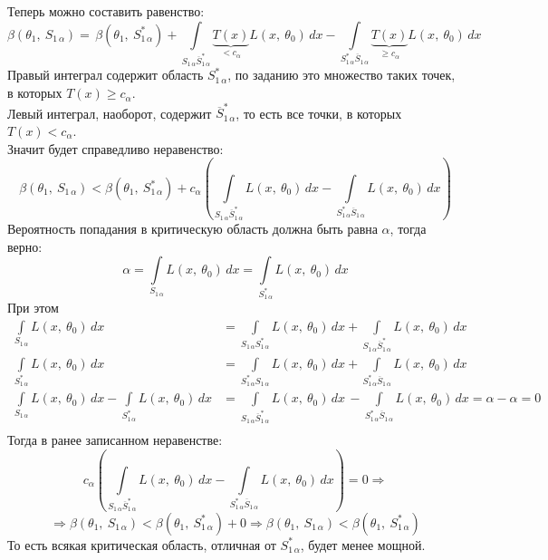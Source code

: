 \documentclass[12pt, a4paper]{article}
\begin{document}
Теперь можно составить равенство:
\[\beta(\theta_1,\ S_{1\, \alpha}) =\, \beta(\theta_1,\ S^*_{1\, \alpha}) + \int\limits_{S_{1\, \alpha} \overline{S}^*_{1\, \alpha}} \underset{< c_{\alpha}}{\underbrace{T(x)}} L(x,\ \theta_0)\, dx - \int\limits_{S^*_{1\, \alpha} \overline{S}_{1\, \alpha}} \underset{\geq c_{\alpha}}{\underbrace{T(x)}} L(x,\ \theta_0)\, dx\]
Правый интеграл содержит область $S_{1\, \alpha}^*$, по заданию это множество таких точек, в которых $T(x) \geq c_{\alpha}$.\\
Левый интеграл, наоборот, содержит $\overline{S}_{1\, \alpha}^*$, то есть все точки, в которых $T(x) < c_{\alpha}$.\\
Значит будет справедливо неравенство:
\[\beta(\theta_1,\ S_{1\, \alpha}) < \beta(\theta_1,\ S^*_{1\, \alpha}) + c_{\alpha}\left( \int\limits_{S_{1\, \alpha} \overline{S}^*_{1\, \alpha}} L(x,\ \theta_0)\, dx - \int\limits_{S^*_{1\, \alpha} \overline{S}_{1\, \alpha}} L(x,\ \theta_0)\, dx \right)\]
Вероятность попадания в критическую область должна быть равна $\alpha$, тогда верно:
\[\alpha = \int\limits_{S_{1\, \alpha}} L(x,\ \theta_0)\, dx = \int\limits_{S^*_{1\, \alpha}} L(x,\ \theta_0)\, dx\]
При этом
\begin{equation*}
    \begin{aligned}
        \int\limits_{S_{1\, \alpha}} L(x,\ \theta_0)\, dx &= \int\limits_{S_{1\, \alpha} S^*_{1\, \alpha}} L(x,\ \theta_0)\, dx + \int\limits_{S_{1\, \alpha} \overline{S}_{1\, \alpha}^*} L(x,\ \theta_0)\, dx\\
        \int\limits_{S^*_{1\, \alpha}} L(x,\ \theta_0)\, dx &= \int\limits_{ S^*_{1\, \alpha} S_{1\, \alpha}} L(x,\ \theta_0)\, dx + \int\limits_{S^*_{1\, \alpha} \overline{S}_{1\, \alpha}} L(x,\ \theta_0)\, dx\\
        \int\limits_{S_{1\, \alpha}} L(x,\ \theta_0)\, dx - \int\limits_{S^*_{1\, \alpha}} L(x,\ \theta_0)\, dx &= \int\limits_{S_{1\, \alpha} \overline{S}_{1\, \alpha}^*} L(x,\ \theta_0)\, dx\, - \int\limits_{S^*_{1\, \alpha} \overline{S}_{1\, \alpha}} L(x,\ \theta_0)\, dx = \alpha - \alpha = 0\\
    \end{aligned}
\end{equation*}
Тогда в ранее записанном неравенстве:
\[c_{\alpha}\left(\int\limits_{S_{1\, \alpha} \overline{S}_{1\, \alpha}^*} L(x,\ \theta_0)\, dx - \int\limits_{S^*_{1\, \alpha} \overline{S}_{1\, \alpha}} L(x,\ \theta_0)\, dx\right) = 0 \Rightarrow\]
\[\Rightarrow \beta(\theta_1,\ S_{1\, \alpha}) < \beta(\theta_1,\ S_{1\, \alpha}^*) + 0 \Rightarrow \beta(\theta_1,\ S_{1\, \alpha}) < \beta(\theta_1,\ S_{1\, \alpha}^*)\]
То есть всякая критическая область, отличная от $S^*_{1\, \alpha}$, будет менее мощной.
\end{document}
